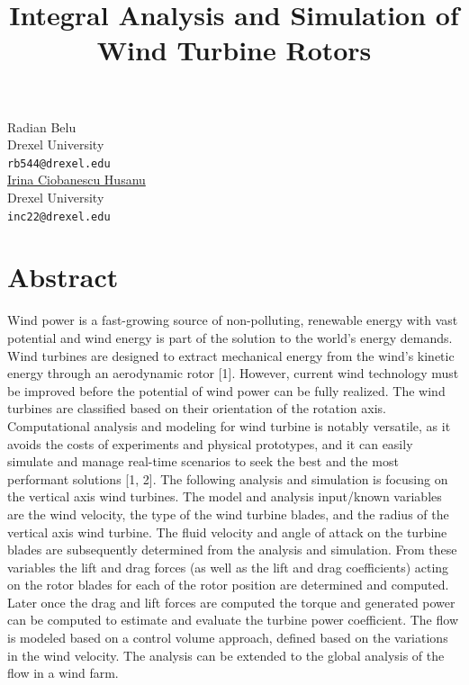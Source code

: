 \documentclass[article,A4,11pt]{llncs}%
\begin{document}
\title{Integral Analysis and Simulation of Wind Turbine Rotors}
 \author{} \institute{}
\maketitle
\begin{center}
{\large Radian Belu}\\
Drexel University\\
{\tt rb544@drexel.edu}
\\ \vspace{4mm}
{\large \underline{Irina Ciobanescu Husanu}}\\
Drexel University\\
{\tt inc22@drexel.edu}
\end{center}

\section*{Abstract}
Wind power is a fast-growing source of non-polluting, renewable energy with vast potential and wind energy is part of the solution to the world's energy demands. Wind turbines are designed to extract mechanical energy from the wind's kinetic energy through an aerodynamic rotor [1]. However, current wind technology must be improved before the potential of wind power can be fully realized. The wind turbines are classified based on their orientation of the rotation axis. Computational analysis and modeling for wind turbine is notably versatile, as it avoids the costs of experiments and physical prototypes, and it can easily simulate and manage real-time scenarios to seek the best and the most performant solutions [1, 2]. The following analysis and simulation is focusing on the vertical axis wind turbines. The model and analysis input/known variables are the wind velocity, the type of the wind turbine blades, and the radius of the vertical axis wind turbine. The fluid velocity and angle of attack on the turbine blades are subsequently determined from the analysis and simulation. From these variables the lift and drag forces (as well as the lift and drag coefficients) acting on the rotor blades for each of the rotor position are determined and computed. Later once the drag and lift forces are computed the torque and generated power can be computed to estimate and evaluate the turbine power coefficient. The flow is modeled based on a control volume approach, defined based on the variations in the wind velocity. The analysis can be extended to the global analysis of the flow in a wind farm.
\end{document}
